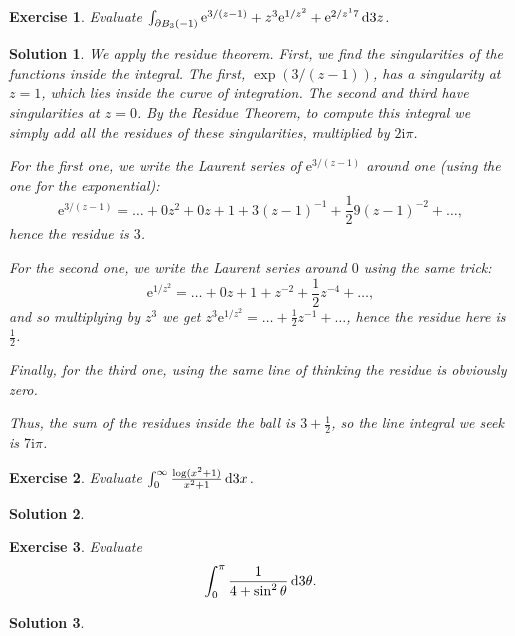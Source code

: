 \documentclass{article}
\newtheorem{ex}{Exercise}
\theoremstyle{nonumberplain}
\newtheorem{sol}{Solution}
\newcommand{\I}{\mathrm{i}}
\newcommand{\e}{\mathrm{e}}
\begin{document}
\begin{ex}
Evaluate $\int_{\partial B_3(-1)} \e^{3/(z-1)} + z^3 \e^{1/z^2} + \e^{2/z^17} \dl3 z$.
\end{ex}

\begin{sol}
We apply the residue theorem. First, we find the singularities of the functions inside the integral. The first, $\exp(3/(z-1))$, has a singularity at $z = 1$, which lies inside the curve of integration. The second and third have singularities at $z = 0$. By the Residue Theorem, to compute this integral we simply add all the residues of these singularities, multiplied by $2 \I \pi$.

For the first one, we write the Laurent series of $\e^{3/(z-1)}$ around one (using the one for the exponential):
\begin{equation}
\e^{3/(z-1)} = \dots + 0 z^2 + 0 z + 1 + 3 (z-1)^{-1} + \frac12 9 (z-1)^{-2} + \dots,
\end{equation}
hence the residue is $3$.

For the second one, we write the Laurent series around $0$ using the same trick:
\begin{equation}
\e^{1/z^2} = \dots + 0z + 1 + z^{-2} + \frac12 z^{-4} + \dots,
\end{equation}
and so multiplying by $z^3$ we get $z^3 \e^{1/z^2} = \dots + \frac12 z^{-1} + \dots$, hence the residue here is $\frac12$.

Finally, for the third one, using the same line of thinking the residue is obviously zero.

Thus, the sum of the residues inside the ball is $3+\frac12$, so the line integral we seek is $7 \I \pi$.
\end{sol}

\begin{ex}
Evaluate $\int_0^\infty \frac{\log(x^2 + 1)}{x^2 + 1} \dl3 x$.
\end{ex}

\begin{sol}
\end{sol}

\begin{ex}
Evaluate
\begin{equation}
\int_0^\pi \frac1{4+\sin^2\theta} \dl3 \theta.
\end{equation}
\end{ex}

\begin{sol}

\end{sol}
\end{document}
